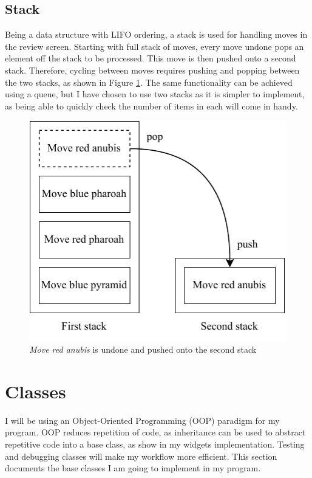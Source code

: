 \documentclass[../main/main.tex]{subfiles}
\begin{document}
\subsection{Stack}
\label{sec:design-stack}
Being a data structure with LIFO ordering, a stack is used for handling moves in the review screen. Starting with full stack of moves, every move undone pops an element off the stack to be processed. This move is then pushed onto a second stack. Therefore, cycling between moves requires pushing and popping between the two stacks, as shown in Figure \ref{fig:stack-diagram}. The same functionality can be achieved using a queue, but I have chosen to use two stacks as it is simpler to implement, as being able to quickly check the number of items in each will come in handy.

\begin{figure}[H]
    \centering
    \includegraphics[width=0.6\columnwidth]{../design/assets/stack.pdf}
    \caption{\textit{Move red anubis} is undone and pushed onto the second stack}
    \label{fig:stack-diagram}
\end{figure}

\section{Classes}
I will be using an Object-Oriented Programming (OOP) paradigm for my program. OOP reduces repetition of code, as inheritance can be used to abstract repetitive code into a base class, as show in my widgets implementation. Testing and debugging classes will make my workflow more efficient. This section documents the base classes I am going to implement in my program.
\end{document}

